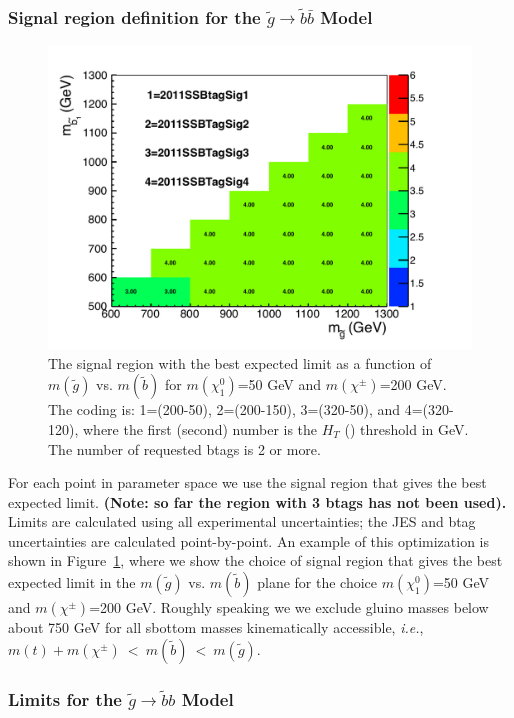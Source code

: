 \subsubsection{Signal region definition for the $\widetilde{g} \to \widetilde{b}\bar{b}$ Model}
\label{sec:gbbdefinition}

\begin{figure}[htb]
\begin{center}
\includegraphics[width=0.65\linewidth]{figs/gl_sb_300_50_regions.pdf}
\caption{The signal region with the best expected limit as a function of 
$m(\widetilde{g})$ vs. $m(\widetilde{b})$ for $m(\chi^0_1)$=50 GeV
and $m(\chi^{\pm})$=200 GeV. 
The coding is: 1=(200-50), 2=(200-150), 3=(320-50), and 4=(320-120), where
the first (second) number is the $H_T$ (\met) threshold in GeV. The number
of requested btags is 2 or more.
\label{fig:gluinosboptimize}}
\end{center}
\end{figure}


For each point in parameter space we use the signal region that gives
the best expected limit.  
{\bf (Note: so far the region with 3 btags has not been used).}
Limits are calculated using all experimental
uncertainties; the JES and btag uncertainties are calculated point-by-point.
An example of this optimization is shown in Figure~\ref{fig:gluinosboptimize},
where we show the choice of signal region that gives the best expected limit
in the $m(\widetilde{g})$ vs. $m(\widetilde{b})$ plane for the choice
$m(\chi^0_1)$=50 GeV and $m(\chi^{\pm})$=200 GeV. 
Roughly speaking we we exclude gluino masses below about 750 GeV for 
all sbottom masses kinematically accessible, {\it i.e.}, 
$m(t)+m(\chi^{\pm})~<~m(\widetilde{b})~<~m(\widetilde{g})$.



\subsubsection{Limits for the $\widetilde{g} \to \widetilde{b}b$ Model}
\label{sec:gbblimits}

